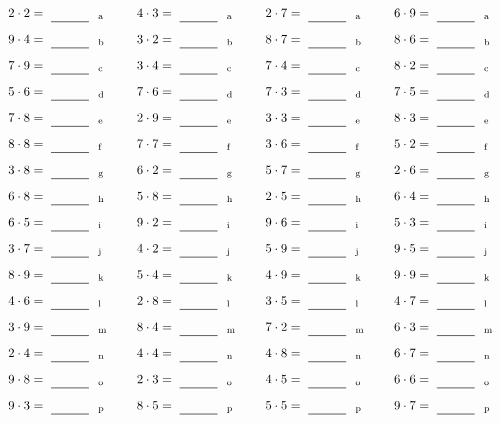 \documentclass
[
  draft    = true,
  fontsize = 11pt,
  parskip  = half-
]
{scrartcl}
\begin{document}
\par\vfill\par
\begin{align*}
    \pline{2\cdot2}&=\rline{a}
  & \pline{4\cdot3}&=\rline{a}
  & \pline{2\cdot7}&=\rline{a}
  & \pline{6\cdot9}&=\rline{a} \\[1ex]
    \pline{9\cdot4}&=\rline{b}
  & \pline{3\cdot2}&=\rline{b}
  & \pline{8\cdot7}&=\rline{b}
  & \pline{8\cdot6}&=\rline{b} \\[1ex]
    \pline{7\cdot9}&=\rline{c}
  & \pline{3\cdot4}&=\rline{c}
  & \pline{7\cdot4}&=\rline{c}
  & \pline{8\cdot2}&=\rline{c} \\[1ex]
    \pline{5\cdot6}&=\rline{d}
  & \pline{7\cdot6}&=\rline{d}
  & \pline{7\cdot3}&=\rline{d}
  & \pline{7\cdot5}&=\rline{d} \\[1ex]
    \pline{7\cdot8}&=\rline{e}
  & \pline{2\cdot9}&=\rline{e}
  & \pline{3\cdot3}&=\rline{e}
  & \pline{8\cdot3}&=\rline{e} \\[1ex]
    \pline{8\cdot8}&=\rline{f}
  & \pline{7\cdot7}&=\rline{f}
  & \pline{3\cdot6}&=\rline{f}
  & \pline{5\cdot2}&=\rline{f} \\[1ex]
    \pline{3\cdot8}&=\rline{g}
  & \pline{6\cdot2}&=\rline{g}
  & \pline{5\cdot7}&=\rline{g}
  & \pline{2\cdot6}&=\rline{g} \\[1ex]
    \pline{6\cdot8}&=\rline{h}
  & \pline{5\cdot8}&=\rline{h}
  & \pline{2\cdot5}&=\rline{h}
  & \pline{6\cdot4}&=\rline{h} \\[1ex]
    \pline{6\cdot5}&=\rline{i}
  & \pline{9\cdot2}&=\rline{i}
  & \pline{9\cdot6}&=\rline{i}
  & \pline{5\cdot3}&=\rline{i} \\[1ex]
    \pline{3\cdot7}&=\rline{j}
  & \pline{4\cdot2}&=\rline{j}
  & \pline{5\cdot9}&=\rline{j}
  & \pline{9\cdot5}&=\rline{j} \\[1ex]
    \pline{8\cdot9}&=\rline{k}
  & \pline{5\cdot4}&=\rline{k}
  & \pline{4\cdot9}&=\rline{k}
  & \pline{9\cdot9}&=\rline{k} \\[1ex]
    \pline{4\cdot6}&=\rline{l}
  & \pline{2\cdot8}&=\rline{l}
  & \pline{3\cdot5}&=\rline{l}
  & \pline{4\cdot7}&=\rline{l} \\[1ex]
    \pline{3\cdot9}&=\rline{m}
  & \pline{8\cdot4}&=\rline{m}
  & \pline{7\cdot2}&=\rline{m}
  & \pline{6\cdot3}&=\rline{m} \\[1ex]
    \pline{2\cdot4}&=\rline{n}
  & \pline{4\cdot4}&=\rline{n}
  & \pline{4\cdot8}&=\rline{n}
  & \pline{6\cdot7}&=\rline{n} \\[1ex]
    \pline{9\cdot8}&=\rline{o}
  & \pline{2\cdot3}&=\rline{o}
  & \pline{4\cdot5}&=\rline{o}
  & \pline{6\cdot6}&=\rline{o} \\[1ex]
    \pline{9\cdot3}&=\rline{p}
  & \pline{8\cdot5}&=\rline{p}
  & \pline{5\cdot5}&=\rline{p}
  & \pline{9\cdot7}&=\rline{p}
\end{align*}
\end{document}
